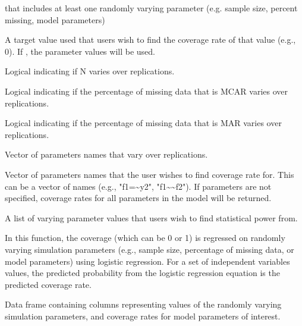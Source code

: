 \documentclass[a4paper]{book}
\begin{document}
\begin{Arguments}
\begin{ldescription}
\item[\code{simResult}] 
 that includes at least one randomly varying parameter (e.g. sample size, percent missing, model parameters)

\item[\code{coverValue}] 
A target value used that users wish to find the coverage rate of that value (e.g., 0). If , the parameter values will be used.

\item[\code{contN}] 
Logical indicating if N varies over replications.

\item[\code{contMCAR}] 
Logical indicating if the percentage of missing data that is MCAR varies over replications.

\item[\code{contMAR}] 
Logical indicating if the percentage of missing data that is MAR varies over replications.

\item[\code{contParam}] 
Vector of parameters names that vary over replications.

\item[\code{coverParam}] 
Vector of parameters names that the user wishes to find coverage rate for. This can be a vector of names (e.g., "f1=\textasciitilde{}y2", "f1\textasciitilde{}\textasciitilde{}f2"). If parameters are not specified, coverage rates for all parameters in the model will be returned.

\item[\code{pred}] 
A list of varying parameter values that users wish to find statistical power from.

\end{ldescription}
\end{Arguments}
%
\begin{Details}\relax
In this function, the coverage (which can be 0 or 1) is regressed on randomly varying simulation parameters (e.g., sample size, percentage of missing data, or model parameters) using logistic regression. For a set of independent variables values, the predicted probability from the logistic regression equation is the predicted coverage rate.
\end{Details}
%
\begin{Value}
Data frame containing columns representing values of the randomly varying simulation parameters, and coverage rates for model parameters of interest.
\end{Value}
\end{document}
